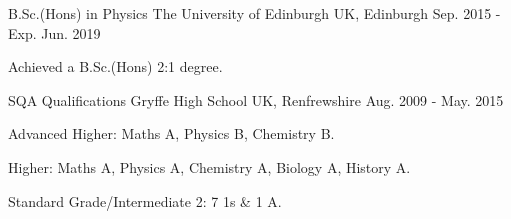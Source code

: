 

\begin{cventries}

  \cventry
    {B.Sc.(Hons) in Physics} %
    {The University of Edinburgh} %
    {UK, Edinburgh} %
    {Sep. 2015 - Exp. Jun. 2019} %
    {
      \begin{cvitems} %
        \item{Achieved a B.Sc.(Hons) 2:1 degree.}
      \end{cvitems}
    }
    
  \cventry
    {SQA Qualifications} %
    {Gryffe High School} %
    {UK, Renfrewshire} %
    {Aug. 2009 - May. 2015} %
    {
      \begin{cvitems} %
        \item {Advanced Higher: Maths A, Physics B, Chemistry B.}
        \item {Higher: Maths A, Physics A, Chemistry A, Biology A, History A.}
        \item {Standard Grade/Intermediate 2: 7 1s \& 1 A.}
      \end{cvitems}
    }

\end{cventries}
